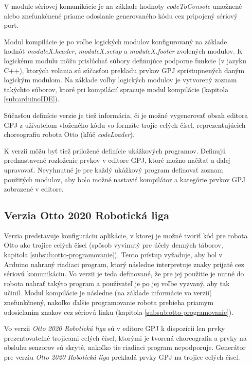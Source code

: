 V module sériovej komunikácie je na základe hodnoty \textit{codeToConsole} umožnené alebo znefunkčnené priame odoslanie generovaného kódu cez pripojený sériový port.

Modul kompilácie je po voľbe logických modulov konfigurovaný na základe hodnôt \textit{moduleX.header}, \textit{moduleX.setup} a \textit{moduleX.footer} zvolených modulov. K logickému modulu môžu prislúchať súbory definujúce podporne funkcie (v jazyku C++), ktorých volania sú súčasťou prekladu prvkov GPJ sprístupnených daným logickým modulom. Na základe voľby logických modulov je vytvorený zoznam takýchto súborov, ktoré pri kompilácií spracuje modul kompilácie (kapitola \ref{sub:arduinoIDE}).

Súčasťou definície verzie je tiež informácia, či je možné vygenerovať obsah editora GPJ z užívateľom vloženého kódu vo formáte trojíc celých čísel, reprezentujúcich choreografiu robota Otto (kľúč \textit{codeLoader}).

K verzii môžu byť tiež priložené definície ukážkových programov. Definujú prednastavené rozloženie prvkov v editore GPJ, ktoré možno načítať a ďalej upravovať. Nevyhnutné je pre každý ukážkový program definovať zoznam použitých modulov, aby bolo možné nastaviť kompilátor a kategórie prvkov GPJ zobrazené v editore.

\subsection{Verzia Otto 2020 Robotická liga}
\label{sub:verzia-otto-2020-rl}
Verzia predstavuje konfiguráciu aplikácie, v ktorej je možné tvoriť kód pre robota Otto ako trojice celých čísel (spôsob vyvinutý pre účely denných táborov, kapitola \ref{subsub:otto-programovanie}). Tento prístup vyžaduje, aby bol v Arduino nahraný  riadiaci program, ktorý následne interpretuje znaky prijaté cez sériovú komunikáciu. Vo verzii je teda definované, že pre jej použitie je nutné do robota nahrať takýto program a používateľ je po jej voľbe vyzvaný, aby tak učinil. Modul kompilácie je následne (na základe informácie vo verzii) znefunkčnený, nakoľko ďalšie programovanie robota prebieha priamym odosielaním znakov cez sériovú linku (kapitola \ref{subsub:otto-programovanie}).

Vo verzii \textit{Otto 2020 Robotická liga} sú v editore GPJ k dispozícii len prvky prezentovateľné trojicami celých čísel, ktorými je tvorená choreografia a prvky na obsluhu senzorov sú skryté, nakoľko tie riadiaci program nepodporuje. Generátor pre verziu \textit{Otto 2020 Robotická liga} prekladá prvky GPJ na trojice celých čísel.

